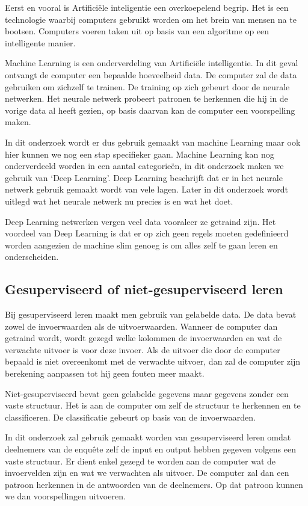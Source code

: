 Eerst en vooral is Artificiële inteligentie een overkoepelend begrip. Het is een technologie waarbij computers gebruikt worden om het brein van mensen na te bootsen. Computers voeren taken uit op basis van een algoritme op een intelligente manier. 

Machine Learning is een onderverdeling van Artificiële intelligentie. In dit geval ontvangt de computer een bepaalde hoeveelheid data. De computer zal de data gebruiken om zichzelf te trainen. De training op zich gebeurt door de neurale netwerken. Het neurale netwerk probeert patronen te herkennen die hij in de vorige data al heeft gezien, op basis daarvan kan de computer een voorspelling maken.

In dit onderzoek wordt er dus gebruik gemaakt van machine Learning maar ook hier kunnen we nog een stap specifieker gaan. Machine Learning kan nog onderverdeeld worden in een aantal categorieën, in dit onderzoek maken we gebruik van ‘Deep Learning’. Deep Learning beschrijft dat er in het neurale netwerk gebruik gemaakt wordt van vele lagen. Later in dit onderzoek wordt uitlegd wat het neurale netwerk nu precies is en wat het doet.

Deep Learning netwerken vergen veel data vooraleer ze getraind zijn. Het voordeel van Deep Learning is dat er op zich geen regels moeten gedefinieerd worden aangezien de machine slim genoeg is om alles zelf te gaan leren en onderscheiden. 

\newpage


\vspace{1cm}
\subsection{Gesuperviseerd of niet-gesuperviseerd leren}

Bij gesuperviseerd leren maakt men gebruik van gelabelde data. De data bevat zowel de invoerwaarden als de uitvoerwaarden. Wanneer de computer dan getraind wordt, wordt gezegd welke kolommen de invoerwaarden en wat de verwachte uitvoer is voor deze invoer. Als de uitvoer die door de computer bepaald is niet overeenkomt met de verwachte uitvoer, dan zal de computer zijn berekening aanpassen tot hij geen fouten meer maakt.

Niet-gesuperviseerd bevat geen gelabelde gegevens maar gegevens zonder een vaste structuur. Het is aan de computer om zelf de structuur te herkennen en te classificeren. De classificatie gebeurt op basis van de invoerwaarden.

In dit onderzoek zal gebruik gemaakt worden van gesuperviseerd leren omdat deelnemers van de enquête zelf de input en output hebben gegeven volgens een vaste structuur. Er dient enkel gezegd te worden aan de computer wat de invoervelden zijn en wat we verwachten als uitvoer. De computer zal dan een patroon herkennen in de antwoorden van de deelnemers. Op dat patroon kunnen we dan voorspellingen uitvoeren.

